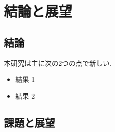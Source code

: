 \documentclass[../thesis]{subfiles}
\begin{document}
\chapter{結論と展望}

\section{結論}
本研究は主に次の2つの点で新しい.
\begin{itemize}
	\item 結果 1
	\item 結果 2
\end{itemize}

\section{課題と展望}
\end{document}
